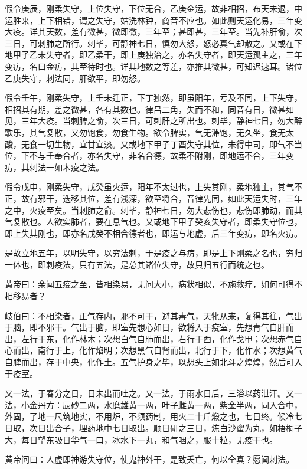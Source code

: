 \documentclass{article}%
\begin{document}
假令庚辰，刚柔失守，上位失守，下位无合，乙庚金运，故非相招，布天未退，中运胜来，上下相错，谓之失守，姑洗林钟，商音不应也。如此则天运化易，三年变大疫。详其天数，差有微甚，微即微，三年至；甚即甚，三年至。当先补肝俞，次三日，可刺肺之所行。刺毕，可静神七日，慎勿大怒，怒必真气却散之。又或在下地甲子乙未失守者，即乙柔干，即上庚独治之，亦名失守者，即天运孤主之，三年变疠，名曰金疠，其至待时也。详其地数之等差，亦推其微甚，可知迟速耳。诸位乙庚失守，刺法同，肝欲平，即勿怒。

假令壬午，刚柔失守，上壬未迁正，下丁独然，即虽阳年，亏及不同，上下失守，相招其有期，差之微甚，各有其数也。律吕二角，失而不和，同音有日，微甚如见，三年大疫。当刺脾之俞，次三日，可刺肝之所出也。刺毕，静神七日，勿大醉歌乐，其气复散，又勿饱食，勿食生物。欲令脾实，气无滞饱，无久坐，食无太酸，无食一切生物，宜甘宜淡。又或地下甲子丁酉失守其位，未得中司，即气不当位，下不与壬奉合者，亦名失守，非名合德，故柔不附刚，即地运不合，三年变疠，其刺法一如木疫之法。

假令戊申，刚柔失守，戊癸虽火运，阳年不太过也，上失其刚，柔地独主，其气不正，故有邪干，迭移其位，差有浅深，欲至将合，音律先同，如此天运失时，三年之中，火疫至矣。当刺肺之俞。刺毕，静神七日，勿大悲伤也，悲伤即肺动，而其气复散也。人欲实肺者，要在息气也。又或地下甲子癸亥失守者，即柔失守位也，即上失其刚也，即亦名戊癸不相合德者也，即运与地虚，后三年变疠，即名火疠。

是故立地五年，以明失守，以穷法刺，于是疫之与疠，即是上下刚柔之名也，穷归一体也，即刺疫法，只有五法，是总其诸位失守，故只归五行而统之也。

黄帝曰：余闻五疫之至，皆相染易，无问大小，病状相似，不施救疗，如何可得不相移易者？

岐伯曰：不相染者，正气存内，邪不可干，避其毒气，天牝从来，复得其往，气出于脑，即不邪干。气出于脑，即室先想心如日，欲将入于疫室，先想青气自肝而出，左行于东，化作林木；次想白气自肺而出，右行于西，化作戈甲；次想赤气自心而出，南行于上，化作焰明；次想黑气自肾而出，北行于下，化作水；次想黄气自脾而出，存于中央，化作土。五气护身之毕，以想头上如北斗之煌煌，然后可入于疫室。

又一法，于春分之日，日未出而吐之。又一法，于雨水日后，三浴以药泄汗。又一法，小金丹方：辰砂二两，水磨雄黄一两，叶子雌黄一两，紫金半两，同入合中，外固，了地一尺筑地实，不用炉，不须药制，用火二十斤煅之也，七日终。候冷七日取，次日出合子，埋药地中七日取出。顺日研之三日，炼白沙蜜为丸，如梧桐子大，每日望东吸日华气一口，冰水下一丸，和气咽之，服十粒，无疫干也。

黄帝问曰：人虚即神游失守位，使鬼神外干，是致夭亡，何以全真？愿闻刺法。
\end{document}
